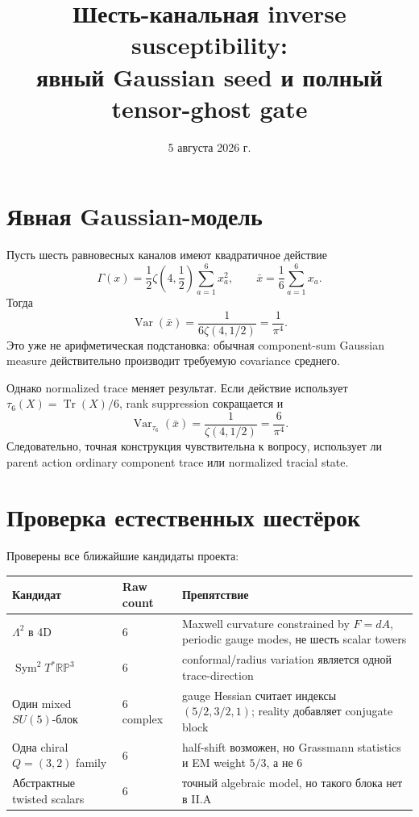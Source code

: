 \documentclass[12pt,a4paper]{article}
\title{Шесть-канальная inverse susceptibility:\\
явный Gaussian seed и полный tensor-ghost gate}
\author{}
\date{5 августа 2026 г.}
\DeclareMathOperator{\Tr}{Tr}
\begin{document}
\maketitle

\section{Явная Gaussian-модель}

Пусть шесть равновесных каналов имеют квадратичное действие
\begin{equation}
 \Gamma(x)=\frac12\zeta\left(4,\frac12\right)
 \sum_{a=1}^{6}x_a^2,
 \qquad
 \bar x=\frac16\sum_{a=1}^{6}x_a.
\end{equation}
Тогда
\begin{equation}
 \operatorname{Var}(\bar x)
 =\frac1{6\zeta(4,1/2)}
 =\frac1{\pi^4}.
\end{equation}
Это уже не арифметическая подстановка: обычная component-sum Gaussian measure
действительно производит требуемую covariance среднего.

Однако normalized trace меняет результат. Если действие использует
\(\tau_6(X)=\Tr(X)/6\), rank suppression сокращается и
\begin{equation}
 \operatorname{Var}_{\tau_6}(\bar x)=\frac1{\zeta(4,1/2)}
 =\frac6{\pi^4}.
\end{equation}
Следовательно, точная конструкция чувствительна к вопросу, использует ли
parent action ordinary component trace или normalized tracial state.

\section{Проверка естественных шестёрок}

Проверены все ближайшие кандидаты проекта:
\begin{center}
\small
\begin{tabular}{p{}p{}p{}}
\toprule
Кандидат & Raw count & Препятствие \\
\midrule
\(\Lambda^2\) в 4D & $6$ & Maxwell curvature constrained by $F=dA$, periodic gauge modes, не шесть scalar towers \\
\(\operatorname{Sym}^2T^*\mathbb{RP}^3\) & $6$ & conformal/radius variation является одной trace-direction \\
Один mixed $SU(5)$-блок & $6$ complex & gauge Hessian считает индексы $(5/2,3/2,1)$; reality добавляет conjugate block \\
Одна chiral $Q=(3,2)$ family & $6$ & half-shift возможен, но Grassmann statistics и EM weight $5/3$, а не $6$ \\
Абстрактные twisted scalars & $6$ & точный algebraic model, но такого блока нет в II.A \\
\bottomrule
\end{tabular}
\end{center}
\end{document}

